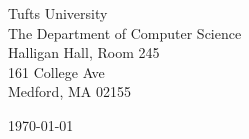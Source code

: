 \begin{minipage}{0.49\textwidth}
\begin{flushleft}
\noindent
Tufts University\\
The Department of Computer Science\\
Halligan Hall, Room 245\\
161 College Ave\\
Medford, MA 02155
\end{flushleft}
\end{minipage}
\begin{minipage}{0.47\textwidth}
\begin{flushright}
\today
\end{flushright}
\end{minipage} \\

\newcommand{\univ}{Tufts University}
\newcommand{\univshort}{Tufts}
\newcommand{\degree}{Ph.D.}
\newcommand{\dept}{Computer Science}

